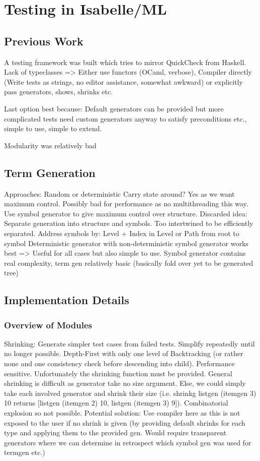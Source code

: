 \chapter{Testing in Isabelle/ML}
\section{Previous Work}
A testing framework was built which tries to mirror QuickCheck from Haskell. Lack of typeclasses => Either use functors (OCaml, verbose), Compiler directly (Write tests as strings, no editor assistance, somewhat awkward) or explicitly pass generators, shows, shrinks etc.

Last option best because: Default generators can be provided but more complicated tests need custom generators anyway to satisfy preconditions etc., simple to use, simple to extend.

Modularity was relatively bad

\section{Term Generation}
Approaches: Random or deterministic
Carry state around? Yes as we want maximum control. Possibly bad for performance as no multithreading this way.
Use symbol generator to give maximum control over structure.
Discarded idea: Separate generation into structure and symbols. Too intertwined to be efficiently separated.
Address symbols by: Level + Index in Level or Path from root to symbol
Deterministic generator with non-deterministic symbol generator works best => Useful for all cases but also simple to use.
Symbol generator contains real complexity, term gen relatively basic (basically fold over yet to be generated tree)

\section{Implementation Details}
\subsection{Overview of Modules}
Shrinking: Generate simpler test cases from failed tests. Simplify repeatedly until no longer possible. Depth-First with only one level of Backtracking (or rather none and one consistency check before descending into child). Performance sensitive. Unfortunately the shrinking function must be provided. General shrinking is difficult as generator take no size argument. Else, we could simply take each involved generator and shrink their size (i.e. shrinkg listgen (itemgen 3) 10 returns [listgen (itemgen 2) 10, listgen (itemgen 3) 9]). Combinatorial explosion so not possible. Potential solution: Use compiler here as this is not exposed to the user if no shrink is given (by providing default shrinks for each type and applying them to the provided gen. Would require transparent generators where we can determine in retrospect which symbol gen was used for termgen etc.)

